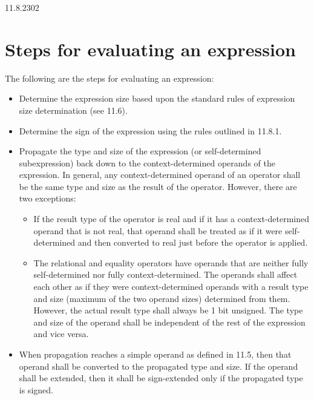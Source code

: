\documentclass{article}
\newcommand{\del}{\color{darkred}}
\begin{document}
\begin{lrmquote}{11.8.2}{302}
  {
    \del{}

    \section{Steps for evaluating an expression}

    The following are the steps for evaluating an expression:
    \begin{itemize}
      \item Determine the expression size based upon the standard rules of
        expression size determination (see 11.6).
      \item Determine the sign of the expression using the rules outlined in
        11.8.1.
      \item Propagate the type and size of the expression (or self-determined
        subexpression) back down to the context-determined operands of the
        expression. In general, any context-determined operand of an operator
        shall be the same type and size as the result of the operator.
        However, there are two exceptions:
        \begin{itemize}
          \item If the result type of the operator is real and if it has a
            context-determined operand that is not real, that operand
            shall be treated as if it were self-determined and then
            converted to real just before the operator is applied.
          \item The relational and equality operators have operands that are
            neither fully self-determined nor fully context-determined. The
            operands shall affect each other as if they were context-determined
            operands with a result type and size (maximum of the two operand
            sizes) determined from them. However, the actual result type shall
            always be 1 bit unsigned. The type and size of the operand shall be
            independent of the rest of the expression and vice versa.
        \end{itemize}
      \item When propagation reaches a simple operand as defined in 11.5, then
        that operand shall be converted to the propagated type and size. If the
        operand shall be extended, then it shall be sign-extended only if the
        propagated type is signed.
    \end{itemize}
  }
\end{lrmquote}
\end{document}

